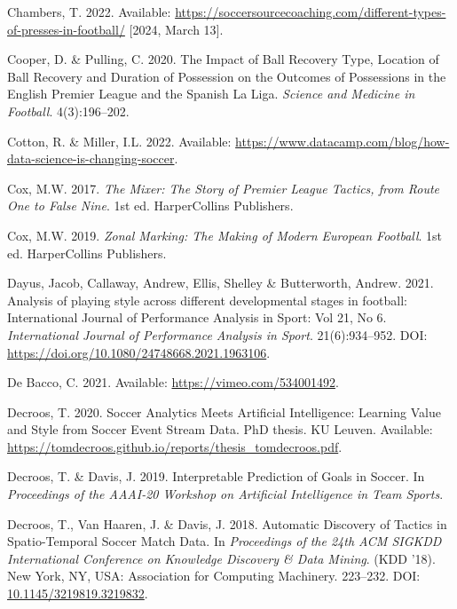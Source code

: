 \documentclass[
  a4paper,
  twoside]{uoe-thesis-template}
\newlength{\cslhangindent}
\newenvironment{CSLReferences}[2] %
 {\begin{list}{}{%
  \setlength{\itemindent}{0pt}
  \setlength{\leftmargin}{0pt}
  \setlength{\parsep}{0pt}
  \ifodd #1
   \setlength{\leftmargin}{\cslhangindent}
   \setlength{\itemindent}{-1\cslhangindent}
  \fi
  \setlength{\itemsep}{#2\baselineskip}}}
 {\end{list}}
\begin{document}
\begin{CSLReferences}{0}{0}
Chambers, T. 2022. Available:
\url{https://soccersourcecoaching.com/different-types-of-presses-in-football/}
{[}2024, March 13{]}.

Cooper, D. \& Pulling, C. 2020. The {Impact} of {Ball} {Recovery}
{Type}, {Location} of {Ball} {Recovery} and {Duration} of {Possession}
on the {Outcomes} of {Possessions} in the {English} {Premier} {League}
and the {Spanish} {La} {Liga}. \emph{Science and Medicine in Football}.
4(3):196--202.

Cotton, R. \& Miller, I.L. 2022. Available:
\url{https://www.datacamp.com/blog/how-data-science-is-changing-soccer}.

Cox, M.W. 2017. \emph{The {Mixer}: {The} {Story} of {Premier} {League}
{Tactics}, from {Route} {One} to {False} {Nine}}. 1st ed. HarperCollins
Publishers.

Cox, M.W. 2019. \emph{Zonal {Marking}: {The} {Making} of {Modern}
{European} {Football}}. 1st ed. HarperCollins Publishers.

Dayus, Jacob, Callaway, Andrew, Ellis, Shelley \& Butterworth, Andrew.
2021. Analysis of playing style across different developmental stages in
football: {International} {Journal} of {Performance} {Analysis} in
{Sport}: {Vol} 21, {No} 6. \emph{International Journal of Performance
Analysis in Sport}. 21(6):934--952. DOI:
\url{https://doi.org/10.1080/24748668.2021.1963106}.

De Bacco, C. 2021. Available: \url{https://vimeo.com/534001492}.

Decroos, T. 2020. Soccer {Analytics} {Meets} {Artificial}
{Intelligence}: {Learning} {Value} and {Style} from {Soccer} {Event}
{Stream} {Data}. PhD thesis. KU Leuven. Available:
\url{https://tomdecroos.github.io/reports/thesis_tomdecroos.pdf}.

Decroos, T. \& Davis, J. 2019. Interpretable {Prediction} of {Goals} in
{Soccer}. In \emph{Proceedings of the {AAAI}-20 {Workshop} on
{Artificial} {Intelligence} in {Team} {Sports}}.

Decroos, T., Van Haaren, J. \& Davis, J. 2018. Automatic {Discovery} of
{Tactics} in {Spatio}-{Temporal} {Soccer} {Match} {Data}. In
\emph{Proceedings of the 24th {ACM} {SIGKDD} {International}
{Conference} on {Knowledge} {Discovery} \& {Data} {Mining}}. ({KDD}
'18). New York, NY, USA: Association for Computing Machinery. 223--232.
DOI:
\href{https://doi.org/10.1145/3219819.3219832}{10.1145/3219819.3219832}.


\end{CSLReferences}
\end{document}
